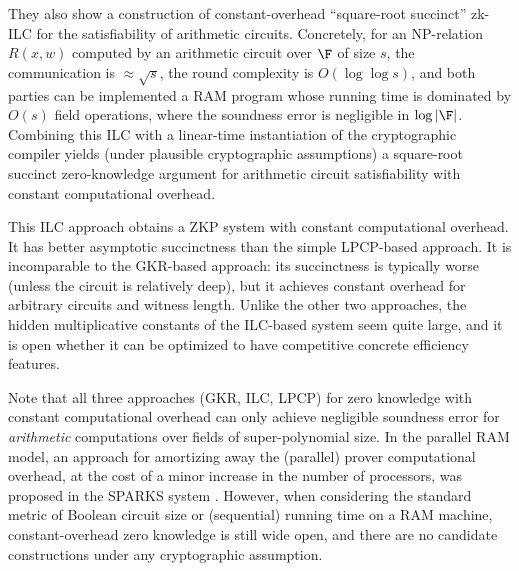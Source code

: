 They also show a construction of constant-overhead ``square-root succinct'' zk-ILC for the satisfiability of arithmetic circuits. 
Concretely, for an NP-relation $R(x,w)$ computed by an arithmetic circuit over $\F$ of size $s$, the communication is $\approx \sqrt{s}$, the round complexity is $O(\log\log s)$, and both parties can be implemented a RAM program whose running time is dominated by $O(s)$ field operations, where the soundness error is negligible in $\log|\F|$.
Combining this ILC with a linear-time instantiation of the cryptographic compiler yields (under plausible cryptographic assumptions) a square-root succinct zero-knowledge argument for arithmetic circuit satisfiability with constant computational overhead.\loosen
\medskip

This ILC approach obtains a ZKP system with constant computational overhead.  
It has better asymptotic succinctness than the simple LPCP-based approach. 
It is incomparable to the GKR-based approach: its succinctness is typically worse (unless the circuit is relatively deep), but it achieves constant overhead for arbitrary circuits and witness length.
Unlike the other two approaches, the hidden multiplicative constants of the ILC-based system seem quite large, and it is open whether it can be optimized to have competitive concrete efficiency features.  
\loosen


Note that all three approaches (GKR, ILC, LPCP) for zero knowledge with constant computational overhead can only achieve negligible soundness error for {\em arithmetic} computations over fields of super-polynomial size. 
In the parallel RAM model, an approach for amortizing away the (parallel) prover computational overhead, at the cost of a minor increase in the number of processors, was proposed in 
the SPARKS system \cite{2020:EFKP:SPARKS}. 
However, when considering the standard metric of Boolean circuit size or (sequential) running time on a RAM machine, constant-overhead zero knowledge is still wide open, and there are no candidate constructions under any cryptographic assumption.\loosen
